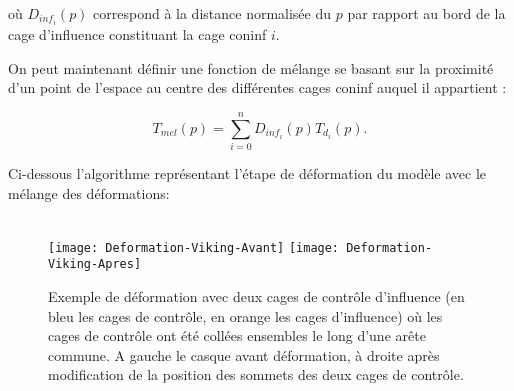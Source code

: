 où $D_{inf_i}(p)$ correspond à la distance normalisée du $p$ par rapport au
bord de la cage d'influence constituant la cage coninf $i$.

On peut maintenant définir une fonction de mélange se basant sur la proximité
d'un point de l'espace au centre des différentes cages coninf auquel il
appartient :

\begin{displaymath}
  T_{mel}(p) = \sum_{i=0}^n D_{inf_i}(p) T_{d_i}(p).
\end{displaymath}

Ci-dessous l'algorithme représentant l'étape de déformation du modèle avec le
mélange des déformations: \\

 \\

\begin{figure}[ht]
  \begin{center}
    \texttt{[image: Deformation-Viking-Avant]}
    \texttt{[image: Deformation-Viking-Apres]}

    \caption[Exemple de déformation cage de contrôle d'influence] {Exemple de
déformation avec deux cages de contrôle d'influence (en bleu les cages de
contrôle, en orange les cages d'influence) où les cages de contrôle ont été
collées ensembles le long d'une arête commune. A gauche le casque avant
déformation, à droite après modification de la position des sommets des deux
cages de contrôle.}

  \end{center}
\end{figure}

